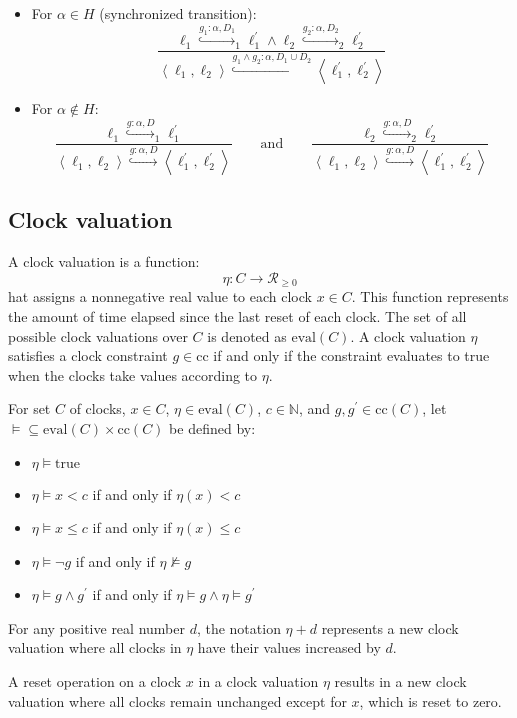 \begin{itemize}
    \item For $\alpha \in H$ (synchronized transition): 
        \[\dfrac{\ell_1\overset{g_1:\alpha,D_1}{\hookrightarrow}_1\ell_1^\prime\land\ell_2\overset{g_2:\alpha,D_2}{\hookrightarrow}_2\ell_2^\prime}{\left\langle \ell_1,\ell_2\right\rangle\overset{g_1\land g_2:\alpha,D_1\cup D_2}{\hookrightarrow}\left\langle \ell_1^\prime,\ell_2^\prime\right\rangle}\]
        \item For $\alpha \notin H$: 
        \[\dfrac{\ell_1\overset{g:\alpha,D}{\hookrightarrow}_1\ell_1^\prime}{\left\langle \ell_1,\ell_2\right\rangle\overset{g:\alpha,D}{\hookrightarrow}\left\langle \ell_1^\prime,\ell_2^\prime\right\rangle} \qquad \text{and}\qquad\dfrac{\ell_2\overset{g:\alpha,D}{\hookrightarrow}_2\ell_2^\prime}{\left\langle \ell_1,\ell_2\right\rangle\overset{g:\alpha,D}{\hookrightarrow}\left\langle \ell_1^\prime,\ell_2^\prime\right\rangle}\]
\end{itemize}

\subsection{Clock valuation}
A clock valuation is a function:
\[\eta:C\rightarrow\mathcal{R}_{\geq 0}\]
hat assigns a nonnegative real value to each clock $x\in C$. 
This function represents the amount of time elapsed since the last reset of each clock.
The set of all possible clock valuations over $C$ is denoted as $\text{eval}(C)$.
A clock valuation $\eta$ satisfies a clock constraint $g\in\text{cc}$  if and only if the constraint evaluates to true when the clocks take values according to $\eta$.
\begin{definition}
    For set $C$ of clocks, $x\in C$, $\eta\in\text{eval}(C)$, $c\in\mathbb{N}$, and $g,g^\prime\in\text{cc}(C)$, let $\models\subseteq\text{eval}(C)\times\text{cc}(C)$ be defined by: 
    \begin{itemize}
        \item $\eta\models\text{true}$
        \item $\eta\models x<c$ if and only if $\eta(x)< c$
        \item $\eta\models x\leq c$ if and only if $\eta(x)\leq c$
        \item $\eta\models \lnot g$ if and only if $\eta\not\models g$
        \item $\eta\models g\land g^\prime$ if and only if $\eta\models g\land \eta\models g^\prime$
    \end{itemize}
\end{definition}
\noindent For any positive real number $d$, the notation $\eta+d$ represents a new clock valuation where all clocks in $\eta$ have their values increased by $d$.
\begin{definition} 
    A reset operation on a clock $x$ in a clock valuation $\eta$ results in a new clock valuation where all clocks remain unchanged except for $x$, which is reset to zero.
\end{definition}

